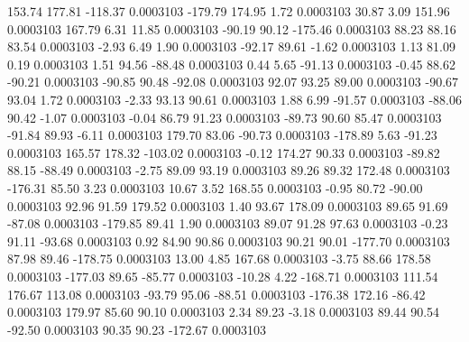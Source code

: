       153.74      177.81     -118.37     0.0003103
     -179.79      174.95        1.72     0.0003103
       30.87        3.09      151.96     0.0003103
      167.79        6.31       11.85     0.0003103
      -90.19       90.12     -175.46     0.0003103
       88.23       88.16       83.54     0.0003103
       -2.93        6.49        1.90     0.0003103
      -92.17       89.61       -1.62     0.0003103
        1.13       81.09        0.19     0.0003103
        1.51       94.56      -88.48     0.0003103
        0.44        5.65      -91.13     0.0003103
       -0.45       88.62      -90.21     0.0003103
      -90.85       90.48      -92.08     0.0003103
       92.07       93.25       89.00     0.0003103
      -90.67       93.04        1.72     0.0003103
       -2.33       93.13       90.61     0.0003103
        1.88        6.99      -91.57     0.0003103
      -88.06       90.42       -1.07     0.0003103
       -0.04       86.79       91.23     0.0003103
      -89.73       90.60       85.47     0.0003103
      -91.84       89.93       -6.11     0.0003103
      179.70       83.06      -90.73     0.0003103
     -178.89        5.63      -91.23     0.0003103
      165.57      178.32     -103.02     0.0003103
       -0.12      174.27       90.33     0.0003103
      -89.82       88.15      -88.49     0.0003103
       -2.75       89.09       93.19     0.0003103
       89.26       89.32      172.48     0.0003103
     -176.31       85.50        3.23     0.0003103
       10.67        3.52      168.55     0.0003103
       -0.95       80.72      -90.00     0.0003103
       92.96       91.59      179.52     0.0003103
        1.40       93.67      178.09     0.0003103
       89.65       91.69      -87.08     0.0003103
     -179.85       89.41        1.90     0.0003103
       89.07       91.28       97.63     0.0003103
       -0.23       91.11      -93.68     0.0003103
        0.92       84.90       90.86     0.0003103
       90.21       90.01     -177.70     0.0003103
       87.98       89.46     -178.75     0.0003103
       13.00        4.85      167.68     0.0003103
       -3.75       88.66      178.58     0.0003103
     -177.03       89.65      -85.77     0.0003103
      -10.28        4.22     -168.71     0.0003103
      111.54      176.67      113.08     0.0003103
      -93.79       95.06      -88.51     0.0003103
     -176.38      172.16      -86.42     0.0003103
      179.97       85.60       90.10     0.0003103
        2.34       89.23       -3.18     0.0003103
       89.44       90.54      -92.50     0.0003103
       90.35       90.23     -172.67     0.0003103
